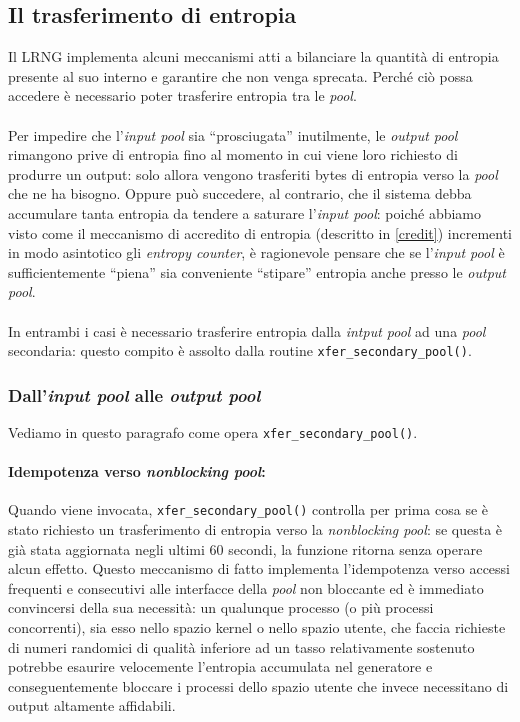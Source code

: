 \documentclass{article}
\begin{document}
 \subsection{Il trasferimento di entropia}\label{trasferimentoentropia}
 Il LRNG implementa alcuni meccanismi atti a bilanciare la quantità di
 entropia presente al suo interno e garantire che non venga
 sprecata. Perché ciò possa accedere è necessario poter trasferire entropia tra
 le \emph{pool}.
  
 \paragraph{}Per impedire che l'\emph{input pool} sia
 ``prosciugata'' inutilmente, le \emph{output pool} rimangono prive di entropia
 fino al momento in cui viene loro richiesto di produrre un output: solo allora
 vengono trasferiti bytes di entropia verso la
 \emph{pool} che ne ha bisogno.
 Oppure può succedere, al contrario, che il sistema debba accumulare tanta
 entropia da tendere a saturare l'\emph{input pool}: poiché abbiamo visto come
 il meccanismo di accredito di entropia (descritto in \ref{credit}) incrementi
 in modo asintotico gli \emph{entropy counter}, è ragionevole pensare che se
 l'\emph{input pool} è sufficientemente ``piena'' sia conveniente ``stipare''
 entropia anche presso le \emph{output pool}.
 
 \paragraph{}In entrambi i casi è necessario trasferire entropia dalla
 \emph{intput pool} ad una \emph{pool} secondaria: questo compito è assolto
 dalla routine \verb+xfer_secondary_pool()+.
 
 
 \subsubsection{Dall'\emph{input pool} alle \emph{output
 pool}}\label{trasf_input_output}
 Vediamo in questo paragrafo come opera \verb+xfer_secondary_pool()+.
 
 \paragraph{Idempotenza verso \emph{nonblocking pool}:}Quando viene invocata,
 \verb+xfer_secondary_pool()+ controlla per prima cosa se è stato richiesto un
 trasferimento di entropia verso la \emph{nonblocking pool}: se questa è già
 stata aggiornata negli ultimi 60 secondi, la funzione ritorna senza operare
 alcun effetto. Questo meccanismo di fatto implementa l'idempotenza verso
 accessi frequenti e consecutivi alle interfacce della \emph{pool} non
 bloccante ed è immediato convincersi della sua necessità: un qualunque processo
 (o più processi concorrenti), sia esso nello spazio
 kernel o nello spazio utente, che faccia richieste di numeri randomici di
 qualità inferiore ad un tasso relativamente sostenuto potrebbe esaurire
 velocemente l'entropia accumulata nel generatore e conseguentemente bloccare i
 processi dello spazio utente che invece necessitano di output altamente
 affidabili. 
 
\end{document}

